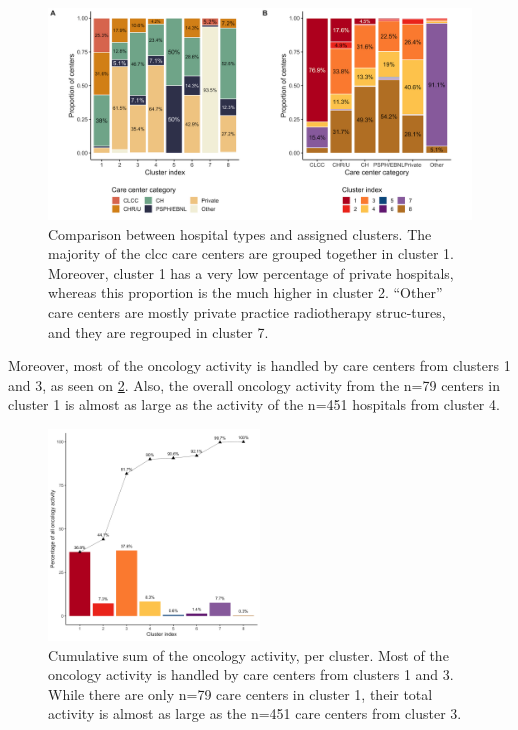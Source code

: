 \begin{figure}[H]
    \includegraphics[width=\textwidth]{images/camion/supplemental/sup_fig2_categories_per_cluster.png}
    \centering
    \caption{
        Comparison between hospital types and assigned clusters. The majority of the \ac{clcc} care centers are grouped together in cluster 1. Moreover, cluster 1 has a very low percentage of private hospitals, whereas this proportion is the much higher in cluster 2. “Other” care centers are mostly private practice radiotherapy struc-tures, and they are regrouped in cluster 7.
    }
    \label{fig:clustering-categories}
\end{figure}

Moreover, most of the oncology activity is handled by care centers from clusters 1 and 3, as seen on \cref{fig:clustering-cumulative}. Also, the overall oncology activity from the n=79 centers in cluster 1 is almost as large as the activity of the n=451 hospitals from cluster 4.

\begin{figure}[H]
    \includegraphics[width=0.5\textwidth]{images/camion/supplemental/sup_fig3_nb_stays_per_cluster.png}
    \centering
    \caption{
        Cumulative sum of the oncology activity, per cluster. Most of the oncology activity is handled by care centers from clusters 1 and 3. While there are only n=79 care centers in cluster 1, their total activity is almost as large as the n=451 care centers from cluster 3.
    }
    \label{fig:clustering-cumulative}
\end{figure}

